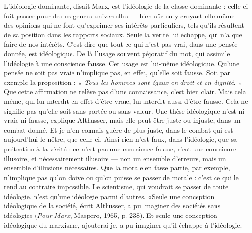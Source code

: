 L’idéologie dominante, disait Marx, est l'idéologie de la classe dominante :
celle-ci fait passer pour des exigences universelles — bien sûr en y croyant elle-même
— des opinions qui ne font qu’exprimer ses intérêts particuliers, tels
qu’ils résultent de sa position dans les rapports sociaux. Seule la vérité lui
échappe, qui n’a que faire de nos intérêts. C’est dire que tout ce qui n’est pas
vrai, dans une pensée donnée, est idéologique. De là l’usage souvent péjoratif
du mot, qui assimile l’idéologie à une conscience fausse. Cet usage est lui-même
idéologique. Qu’une pensée ne soit pas vraie n’implique pas, en effet,
qu’elle soit fausse. Soit par exemple la proposition : {\it « Tous les hommes sont
égaux en droit et en dignité. »} Que cette affirmation ne relève pas d’une connaissance,
c’est bien clair. Mais cela même, qui lui interdit en effet d’être vraie, lui
interdit aussi d’être fausse. Cela ne signifie pas qu’elle soit sans portée ou sans
valeur. Une thèse idéologique n’est ni vraie ni fausse, explique Althusser, mais
elle peut être juste ou injuste, dans un combat donné. Et je n’en connais guère
de plus juste, dans le combat qui est aujourd’hui le nôtre, que celle-ci. Ainsi
rien n’est faux, dans l'idéologie, que sa prétention à la vérité : ce n’est pas une
conscience fausse, c’est une conscience illusoire, et nécessairement illusoire —
non un ensemble d’erreurs, mais un ensemble d'illusions nécessaires. Que la
morale en fasse partie, par exemple, n'implique pas qu’on doive ou qu’on
puisse se passer de morale : c’est ce qui le rend au contraire impossible. Le
scientisme, qui voudrait se passer de toute idéologie, n’est qu’une idéologie
parmi d’autres. «Seule une conception idéologique de la société, écrit
Althusser, a pu imaginer des sociétés sans idéologies ({\it Pour Marx}, Maspero,
1965, p. 238). Et seule une conception idéologique du marxisme, ajouterai-je,
a pu imaginer qu’il échappe à l'idéologie.

